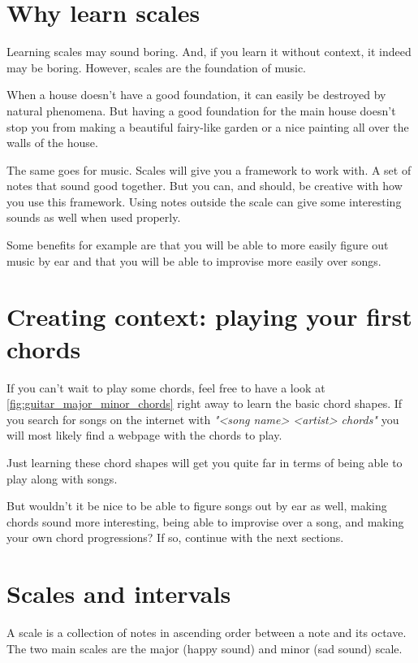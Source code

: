 \section{Why learn scales}

Learning scales may sound boring. And, if you learn it without context, it indeed may be boring. However, scales are the foundation of music.

When a house doesn't have a good foundation, it can easily be destroyed by natural phenomena. But having a good foundation for the main house doesn't stop you from making a beautiful fairy-like garden or a nice painting all over the walls of the house.

The same goes for music. Scales will give you a framework to work with. A set of notes that sound good together. But you can, and should, be creative with how you use this framework. Using notes outside the scale can give some interesting sounds as well when used properly.

Some benefits for example are that you will be able to more easily figure out music by ear and that you will be able to improvise more easily over songs. 

\section{Creating context: playing your first chords}

If you can't wait to play some chords, feel free to have a look at \autoref{fig:guitar_major_minor_chords} right away to learn the basic chord shapes. If you search for songs on the internet with \textit{"<song name> <artist> chords"} you will most likely find a webpage with the chords to play.

Just learning these chord shapes will get you quite far in terms of being able to play along with songs.

But wouldn't it be nice to be able to figure songs out by ear as well, making chords sound more interesting, being able to improvise over a song, and making your own chord progressions? If so, continue with the next sections.

\newpage

\section{Scales and intervals}

A scale is a collection of notes in ascending order between a note and its octave. The two main scales are the major (happy sound) and minor (sad sound) scale.

